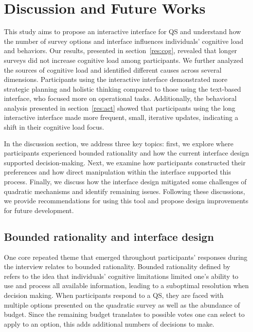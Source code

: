 \section{Discussion and Future Works}
\label{sec:discussion}
This study aims to propose an interactive interface for QS and understand how the number of survey options and interface influences individuals' cognitive load and behaviors. Our results, presented in section~\ref{res:cog}, revealed that longer surveys did not increase cognitive load among participants. We further analyzed the sources of cognitive load and identified different causes across several dimensions. Participants using the interactive interface demonstrated more strategic planning and holistic thinking compared to those using the text-based interface, who focused more on operational tasks. Additionally, the behavioral analysis presented in section~\ref{res:act} showed that participants using the long interactive interface made more frequent, small, iterative updates, indicating a shift in their cognitive load focus.

In the discussion section, we address three key topics: first, we explore where participants experienced bounded rationality and how the current interface design supported decision-making. Next, we examine how participants constructed their preferences and how direct manipulation within the interface supported this process. Finally, we discuss how the interface design mitigated some challenges of quadratic mechanisms and identify remaining issues. Following these discussions, we provide recommendations for using this tool and propose design improvements for future development.

\subsection{Bounded rationality and interface design}
One core repeated theme that emerged throughout participants' responses during the interview relates to bounded rationality. Bounded rationality defined by~\textcite{simonBehavioralModelRational1955} refers to the idea that individuals' cognitive limitations limited one's ability to use and process all available information, leading to a suboptimal resolution when decision making. When participants respond to a QS, they are faced with multiple options presented on the quadratic survey as well as the abundance of budget. Since the remaining budget translates to possible votes one can select to apply to an option, this adds additional numbers of decisions to make.

